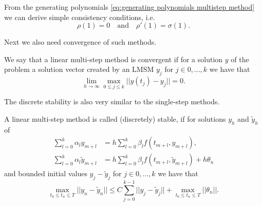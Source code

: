 	From the generating polynomials \eqref{eq:generating polynomials multistep method} we can derive simple consistency conditions, i.e.
	\begin{displaymath}
		\rho(1) = 0 \quad \text{and} \quad \rho'(1) = \sigma(1).
	\end{displaymath}

	Next we also need convergence of such methods.
	
	\begin{definition} \label{def: LMSM convergence}
		We say that a linear multi-step method is convergent if for a solution $y$ of the problem a solution vector created by an LMSM $y_j$ for $j \in {0,...,k}$ we have that
		\begin{displaymath}
			\lim\limits_{h \to \infty} \max_{0 \leq j \leq k} ||y(t_j) - y_j|| = 0.
		\end{displaymath}
	\end{definition}
	
	
	The discrete stability is also very similar to the single-step methods.
	\begin{definition} \label{discrete stability LMSM}
		A linear multi-step method is called (discretely) stable, if for solutions $y_h$ and $\tilde{y}_h$ of
		\begin{align}
			\sum_{l=0}^{k} \alpha_l y_{m+l} &= h \sum_{l=0}^{k} \beta_l f(t_{m+l}, y_{m+l}), \\
			\sum_{l=0}^{k} \alpha_l \tilde{y}_{m+l} &= h \sum_{l=0}^{k} \beta_l f(t_{m+l}, \tilde{y}_{m+l}) + h\theta_n
		\end{align} 
		and bounded initial values $y_j - \tilde{y}_j$ for $j \in {0,...,k}$ we have that
		\begin{displaymath}
			\max_{t_0 \leq t_n \leq T} ||y_n - \tilde{y}_n|| \leq C \sum_{j=0}^{k-1} ||y_j - \tilde{y}_j|| + \max_{t_0 \leq t_n \leq T} ||\theta_n||.
		\end{displaymath}
	\end{definition}
	
	
